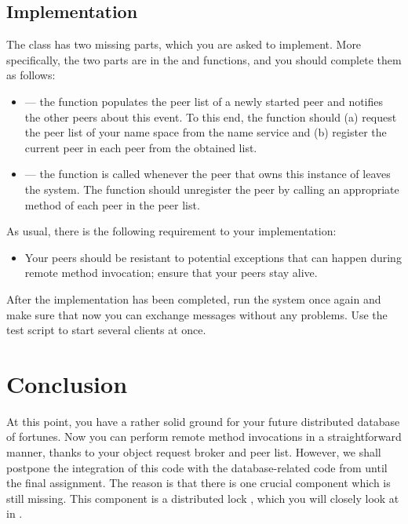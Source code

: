 \documentclass[a4paper]{article}
\begin{document}
\subsection{Implementation}
The  class has two missing parts, which you are asked to
implement. More specifically, the two parts are in the  and
 functions, and you should complete them as follows:
\begin{itemize}

  \item {} --- the function populates the peer list of a newly
  started peer and notifies the other peers about this event. To this end, the
  function should (a) request the peer list of your name space from the name
  service and (b) register the current peer in each peer from the obtained list.

  \item {} --- the function is called whenever the peer that owns
  this instance of  leaves the system. The function should
  unregister the peer by calling an appropriate method of each peer in the peer
  list.

\end{itemize}
As usual, there is the following requirement to your implementation:
\begin{itemize}

  \item Your peers should be resistant to potential exceptions that can happen
  during remote method invocation; ensure that your peers stay alive.

\end{itemize}
After the implementation has been completed, run the system once again and make
sure that now you can exchange messages without any problems. Use the test
script to start several clients at once.

\section{Conclusion}
At this point, you have a rather solid ground for your future distributed
database of fortunes. Now you can perform remote method invocations in a
straightforward manner, thanks to your object request broker and peer list.
However, we shall postpone the integration of this code with the
database-related code from  until the final assignment. The reason is
that there is one crucial component which is still missing. This component is a
distributed lock \cite{lecture67}, which you will closely look at in .

\printbibliography
\end{document}
